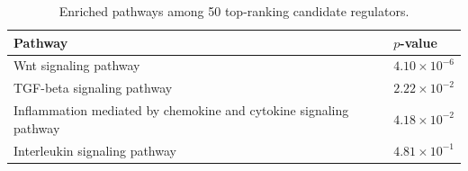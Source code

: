 \documentclass{article}
\begin{document}
\begin{table}[tb]
  \caption{Enriched pathways among 50 top-ranking candidate regulators.}
  \label{tab:pathways}
 \centering
  \begin{tabularx}{\columnwidth}{Xl}
    Pathway & $p$-value \\
    \hline
    Wnt signaling pathway &	$4.10\times 10^{-6}$ \\
    TGF-beta signaling pathway & $2.22\times 10^{-2}$ \\
    Inflammation mediated by chemokine and cytokine signaling pathway & $4.18\times 10^{-2}$ \\
    Interleukin signaling pathway & $4.81\times 10^{-1}$\\
  \end{tabularx}
\end{table}

\end{document}
